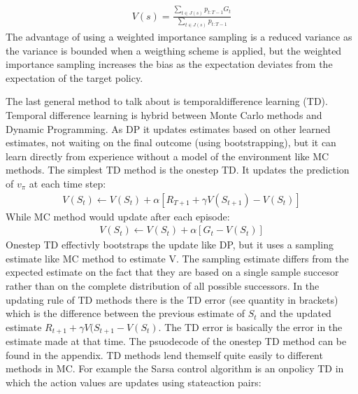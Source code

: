\documentclass[letterpaper,10pt,english]{jupyterBook}
\begin{document}
\begin{equation*}
\begin{split} V(s) = \frac{\sum_{t \in J(s)}p_{t:T-1}G_t}{\sum_{t \in J(s)}p_{t:T-1}} \end{split}
\end{equation*}
\sphinxAtStartPar
The advantage of using a weighted importance sampling is a reduced variance as the variance is bounded when a weigthing scheme is applied, but the weighted importance sampling increases the bias as the expectation deviates from the expectation of the target policy.

\sphinxAtStartPar
The last general method to talk about is temporal\sphinxhyphen{}difference learning (TD). Temporal difference learning is hybrid between Monte Carlo methods and Dynamic Programming. As DP it updates estimates based on other learned estimates, not waiting on the final outcome (using bootstrapping), but it can learn directly from experience without a model of the environment like MC methods. The simplest TD method is the one\sphinxhyphen{}step TD. It updates the prediction of \(v_{\pi}\) at each time step:
\begin{equation*}
\begin{split}V(S_t) \leftarrow V(S_t) + \alpha[R_{T+1} + \gamma V(S_{t+1}) - V(S_t)]\end{split}
\end{equation*}
\sphinxAtStartPar
While MC method would update after each episode:
\begin{equation*}
\begin{split} V(S_t) \leftarrow V(S_t) + \alpha[G_t - V(S_t)] \end{split}
\end{equation*}
\sphinxAtStartPar
One\sphinxhyphen{}step TD effectivly bootstraps the update like DP, but it uses a sampling estimate like MC method to estimate V. The sampling estimate differs from the expected estimate on the fact that they are based on a single sample succesor rather than on the complete distribution of all possible successors. In the updating rule of TD methods there is the TD error (see quantity in brackets) which is the difference between the previous estimate of \(S_t\) and the updated estimate  \(R_{t+1} + \gamma V(S_{t+1} - V(S_t)\). The TD error is basically the error in the estimate made at that time. The psuodecode of the one\sphinxhyphen{}step TD method can be found in the appendix. TD methods lend themself quite easily to different methods in MC. For example the Sarsa control algorithm is an on\sphinxhyphen{}policy TD in which the action values are updates using state\sphinxhyphen{}action pairs:
\end{document}
